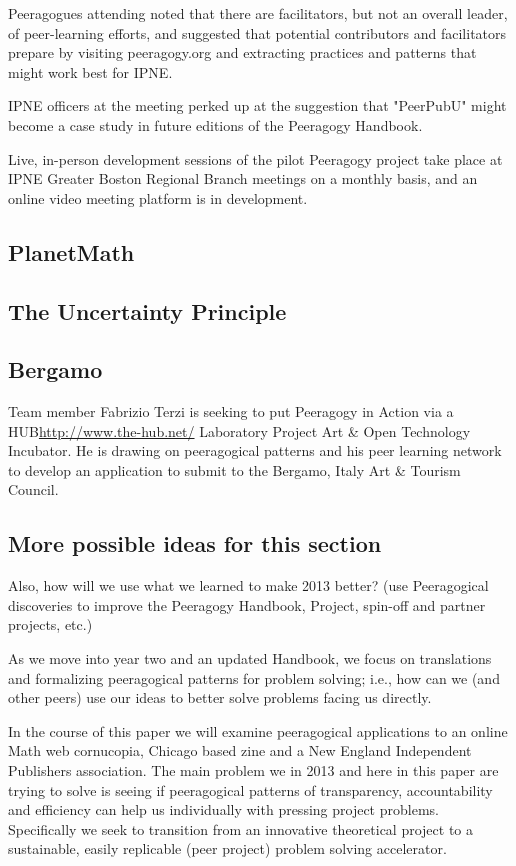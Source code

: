 \documentclass{acm_proc_article-sp}
\begin{document}
Peeragogues attending noted that there are facilitators, but not an overall leader, of peer-learning efforts, and suggested that potential contributors and facilitators prepare by visiting peeragogy.org and extracting practices and patterns that might work best for IPNE.

IPNE officers at the meeting perked up at the suggestion that "PeerPubU" might become a case study in future editions of the Peeragogy Handbook.

Live, in-person development sessions of the pilot Peeragogy project take place at IPNE Greater Boston Regional Branch meetings on a monthly basis, and an online video meeting platform is in development.

\subsection{PlanetMath}

\subsection{The Uncertainty Principle}

\subsection{Bergamo}

Team member Fabrizio Terzi is seeking to put Peeragogy in Action via a HUB\url{http://www.the-hub.net/} Laboratory Project Art & Open Technology Incubator. He is drawing on peeragogical patterns and his peer learning network to develop an application to submit to the Bergamo, Italy Art & Tourism Council.


\subsection{More possible ideas for this section}

Also, how will we use what we learned to make 2013 better? (use
Peeragogical discoveries to improve the Peeragogy Handbook, Project,
spin-off and partner projects, etc.)

As we move into year two and an updated Handbook, we focus on translations and formalizing peeragogical patterns for problem solving; i.e., how can we (and other peers) use our ideas to better solve problems facing us directly.

In the course of this paper we will examine peeragogical applications to an online Math web cornucopia, Chicago based zine and a New England Independent Publishers association. The main problem we in 2013 and here in this paper are trying to solve is seeing if peeragogical patterns of transparency, accountability and efficiency can help us individually with pressing project problems. Specifically we seek to transition from an innovative theoretical project to a sustainable, easily replicable (peer project) problem solving accelerator.
\end{document}

